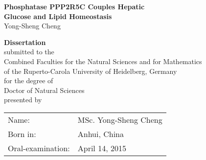 \documentclass[
     12pt,         %
     a4paper,      %
     BCOR10mm,     %
     DIV14,        %
     listof=totoc,   %
     bibliography=totoc,     %
     index=totoc,     %
     ]{scrreprt}   %
\newcommand{\blankpage}{
\newpage
\thispagestyle{empty}
\mbox{}
\addtocounter{page}{-1}%
\newpage
}
\begin{document}
 
\begin{titlepage}

\thispagestyle{empty}

\vspace*{5cm} %

\begin{center}

\begin{minipage}{0.8\textwidth}\centering

{\large \textbf{Phosphatase PPP2R5C Couples Hepatic\\
\vspace{0.5cm}
Glucose and Lipid Homeostasis}\\
\vspace{2cm}
Yong-Sheng Cheng
}
\end{minipage}

\end{center}

\blankpage
\thispagestyle{empty}

\vspace*{1cm}
\begin{center}
\vspace*{3cm} 
\textbf{\Large{Dissertation}}\\
\vspace*{1cm}
\large{
submitted to the\\
Combined Faculties for the Natural Sciences and for Mathematics\\
of the Ruperto-Carola University of Heidelberg, Germany\\
for the degree of\\
Doctor of Natural Sciences\\


\vfill 
presented by\\
}

\vspace*{1cm}

{\large
\begin{tabular}[l]{ll}
Name: & MSc. Yong-Sheng Cheng\\
Born in: & Anhui, China\\
Oral-examination: & April 14, 2015
\end{tabular}
}

\end{center}
\blankpage
\thispagestyle{empty}

\vspace*{5cm}


\end{titlepage}
\end{document}
